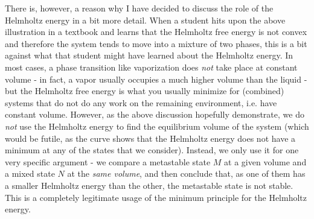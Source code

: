 \documentclass[a4paper, draft]{article}
\theoremstyle{own}
\theoremstyle{remark}
\begin{document}
There is, however, a reason why I have decided to discuss the role of the Helmholtz energy in a bit more detail. When a student hits upon the above illustration in a textbook and learns that the Helmholtz free energy is not convex and therefore the system tends to move into a mixture of two phases, this is a bit against what that student might have learned about the Helmholtz energy. In most cases, a phase transition like vaporization does {\em not} take place at constant volume - in fact, a vapor usually occupies a much higher volume than the liquid - but the Helmholtz free energy is what you usually minimize for (combined) systems that do not do any work on the remaining environment, i.e. have constant volume. However, as the above discussion hopefully demonstrate, we do {\em not} use the Helmholtz energy to find the equilibrium volume of the system (which would be futile, as the curve shows that the Helmholtz energy does not have a minimum at any of the states that we consider). Instead, we only use it for one very specific argument - we compare a metastable state $M$ at a given volume and a mixed state $N$ at the {\em same volume}, and then conclude that, as one of them has a smaller Helmholtz energy than the other, the metastable state is not stable. This is a completely legitimate usage of the minimum principle for the Helmholtz energy.
\end{document}
